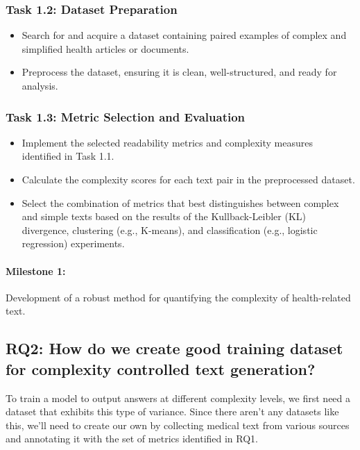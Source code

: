 \subsubsection*{Task 1.2: Dataset Preparation}

\begin{itemize}
    \item Search for and acquire a dataset containing paired examples of complex and simplified health articles or documents.
    \item Preprocess the dataset, ensuring it is clean, well-structured, and ready for analysis.
\end{itemize}

\subsubsection*{Task 1.3: Metric Selection and Evaluation}

\begin{itemize}
    \item Implement the selected readability metrics and complexity measures identified in Task 1.1.
    \item Calculate the complexity scores for each text pair in the preprocessed dataset.
    \item Select the combination of metrics that best distinguishes between complex and simple texts based on the results of the Kullback-Leibler (KL) divergence, clustering (e.g., K-means), and classification (e.g., logistic regression) experiments.
\end{itemize}

\paragraph{Milestone 1:} Development of a robust method for quantifying the complexity of health-related text.

\subsection*{RQ2: How do we create good training dataset for complexity controlled text generation?}

To train a model to output answers at different complexity levels, we first need a dataset that exhibits this type of variance.
Since there aren't any datasets like this, we'll need to create our own by collecting medical text from various sources and annotating it with the set of metrics identified in RQ1.

